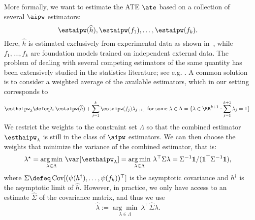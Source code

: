 More formally, we want to estimate the ATE $\ate$ based
on a collection of several $\aipw$ estimators: $$\estaipw(\widehat h), \estaipw(f_1),\ldots, \estaipw(f_k).$$ Here,  $\widehat h$ is estimated exclusively from experimental data as shown in~, while $f_1,\ldots, f_k$ are foundation models trained on independent external data. The problem of dealing with several competing estimators of the
same quantity has been extensively studied in the statistics literature; see e.g. \citet{lavancier2016general}.
A common solution is to consider a weighted average of the available estimators, which in our setting corresponds to 
$$
\esthaipw_\lambda \defeq \lambda_{1} \estaipw(\widehat h) + \sum_{j=1}^k  \estaipw(f_j)\lambda_{j+1},~\text{for some}~\lambda \in \Lambda = \{\lambda \in \RR^{k+1}: \sum_{j=1}^{k+1} \lambda_j =1 \}.$$ We restrict the weights to the constraint set $\Lambda$ so that the combined estimator $\esthaipw_\lambda$ is still in the class of $\aipw$ estimators. We can then choose the weights that minimize the variance of the combined estimator, that is:
\begin{equation*}
 \lambda^\star = \underset{\lambda \in \Lambda}{\arg\min}~\var[ \esthaipw_\lambda] = \underset{\lambda \in \Lambda}{\arg\min}~ \lambda^\top  \Sigma \lambda =  \Sigma^{-1} \mathbf 1 / (\mathbf 1^\top  \Sigma^{-1} \mathbf 1) , 
\end{equation*}
where $\Sigma \defeq 
    \operatorname{Cov}[ (\psi(h^\dagger), \ldots, \psi(f_k))^\top] $
    is the asymptotic covariance  and $h^\dagger$ is the asymptotic limit of $\widehat h$. However, in practice, we only have access to an estimate $\widehat \Sigma$ of the covariance matrix, and thus we use  
   $$\widehat \lambda := \underset{\lambda \in \Lambda}{\arg\min}~ \lambda^\top \widehat \Sigma \lambda.$$ 
    
    
    

    
    


